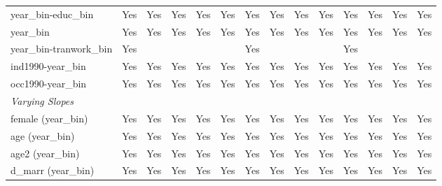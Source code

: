 \begin{tabular}{lccccccccccccc}
   year\_bin-educ\_bin                     & Yes           & Yes           & Yes           & Yes          & Yes           & Yes           & Yes           & Yes          & Yes           & Yes           & Yes                   & Yes           & Yes\\  
   year\_bin                               & Yes           & Yes           & Yes           & Yes          & Yes           & Yes           & Yes           & Yes          & Yes           & Yes           & Yes                   & Yes           & Yes\\  
   year\_bin-tranwork\_bin                 & Yes           &               &               &              &               & Yes           &               &              &               & Yes           &                       &               & \\  
   ind1990-year\_bin                       & Yes           & Yes           & Yes           & Yes          & Yes           & Yes           & Yes           & Yes          & Yes           & Yes           & Yes                   & Yes           & Yes\\  
   occ1990-year\_bin                       & Yes           & Yes           & Yes           & Yes          & Yes           & Yes           & Yes           & Yes          & Yes           & Yes           & Yes                   & Yes           & Yes\\  
   \midrule
   \emph{Varying Slopes}\\
   female (year\_bin)                      & Yes           & Yes           & Yes           & Yes          & Yes           & Yes           & Yes           & Yes          & Yes           & Yes           & Yes                   & Yes           & Yes\\  
   age (year\_bin)                         & Yes           & Yes           & Yes           & Yes          & Yes           & Yes           & Yes           & Yes          & Yes           & Yes           & Yes                   & Yes           & Yes\\  
   age2 (year\_bin)                        & Yes           & Yes           & Yes           & Yes          & Yes           & Yes           & Yes           & Yes          & Yes           & Yes           & Yes                   & Yes           & Yes\\  
   d\_marr (year\_bin)                     & Yes           & Yes           & Yes           & Yes          & Yes           & Yes           & Yes           & Yes          & Yes           & Yes           & Yes                   & Yes           & Yes\\  

\end{tabular}

